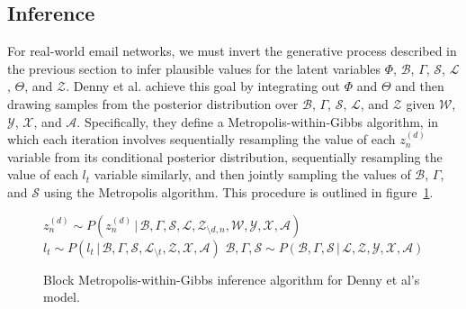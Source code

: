 \documentclass{pnastwo}
\newcommand{\g}{\,|\,}
\begin{document}
\begin{article}


\subsection{Inference}

For real-world email networks, we must invert the generative process
described in the previous section to infer plausible values for the
latent variables $\Phi$, $\mathcal{B}$, $\Gamma$, $\mathcal{S}$,
$\mathcal{L}$, $\Theta$, and $\mathcal{Z}$. Denny et al. achieve this
goal by integrating out $\Phi$ and $\Theta$ and then drawing samples
from the posterior distribution over $\mathcal{B}$, $\Gamma$,
$\mathcal{S}$, $\mathcal{L}$, and $\mathcal{Z}$ given $\mathcal{W}$,
$\mathcal{Y}$, $\mathcal{X}$, and $\mathcal{A}$. Specifically, they
define a Metropolis-within-Gibbs algorithm, in which each iteration
involves sequentially resampling the value of each $z_n^{(d)}$
variable from its conditional posterior distribution, sequentially
resampling the value of each $l_t$ variable similarly, and then
jointly sampling the values of $\mathcal{B}$, $\Gamma$, and
$\mathcal{S}$ using the Metropolis algorithm. This procedure is
outlined in figure~\ref{fig:inference_algorithm}.

\begin{figure}[ht]
  \caption{\label{fig:inference_algorithm}Block Metropolis-within-Gibbs inference algorithm for Denny et al's model.}
  
  \begin{algorithmic}[1]
    \State $z^{(d)}_n \sim P(z_n^{(d)} \g
    \mathcal{B},
    \Gamma, \mathcal{S}, \mathcal{L},
    \mathcal{Z}_{\setminus d, n},
    \mathcal{W}, \mathcal{Y}, \mathcal{X},
    \mathcal{A})$
    \EndFor
    \EndFor
    \State $l_t \sim
    P(l_t \g \mathcal{B},
    \Gamma,
    \mathcal{S},
    \mathcal{L}_{\setminus
      t}, \mathcal{Z},
    \mathcal{X},
    \mathcal{A})$
    \EndFor
    \State $\mathcal{B},
    \Gamma,
    \mathcal{S}
    \sim
    P(\mathcal{B},
    \Gamma,
    \mathcal{S}
    \g
    \mathcal{L},
    \mathcal{Z},
    \mathcal{Y},
    \mathcal{X},
    \mathcal{A})$
    \EndFor
  \end{algorithmic}
\end{figure}


\end{article}
\end{document}
